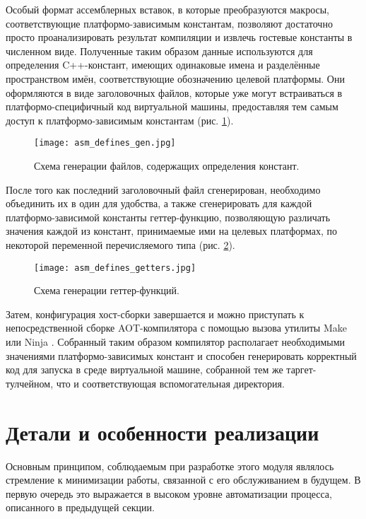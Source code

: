 Особый формат ассемблерных вставок, в которые преобразуются макросы, соответствующие платформо-зависимым константам, позволяют достаточно просто проанализировать результат компиляции и извлечь гостевые константы в численном виде.
Полученные таким образом данные используются для определения C++-констант, имеющих одинаковые имена и разделённые пространством имён, соответствующие обозначению целевой платформы. Они оформляются в виде заголовочных файлов, которые уже могут встраиваться в платформо-специфичный код виртуальной машины, предоставляя тем самым доступ к платформо-зависимым константам (рис. \ref{fig:asm_defines_gen}).

\begin{figure}[H]
    \centering
    \texttt{[image: asm\_defines\_gen.jpg]}
    \caption{Схема генерации файлов, содержащих определения констант.}
    \label{fig:asm_defines_gen}
\end{figure}

После того как последний заголовочный файл сгенерирован, необходимо объединить их в один для удобства, а также сгенерировать для каждой платформо-зависимой константы геттер-функцию, позволяющую различать значения каждой из констант, принимаемые ими на целевых платформах, по некоторой переменной перечисляемого типа (рис. \ref{fig:asm_defines_getters}).

\begin{figure}[H]
    \centering
    \texttt{[image: asm\_defines\_getters.jpg]}
    \caption{Схема генерации геттер-функций.}
    \label{fig:asm_defines_getters}
\end{figure}

Затем, конфигурация хост-сборки завершается и можно приступать к непосредственной сборке AOT-компилятора с помощью вызова утилиты Make \cite{make} или Ninja \cite{ninja}. Собранный таким образом компилятор располагает необходимыми значениями платформо-зависимых констант и способен генерировать корректный код для запуска в среде виртуальной машине, собранной тем же таргет-тулчейном, что и соответствующая вспомогательная директория.

\section{Детали и особенности реализации}
Основным принципом, соблюдаемым при разработке этого модуля являлось стремление к минимизации работы, связанной с его обслуживанием в будущем. В первую очередь это выражается в высоком уровне автоматизации процесса, описанного в предыдущей секции.

